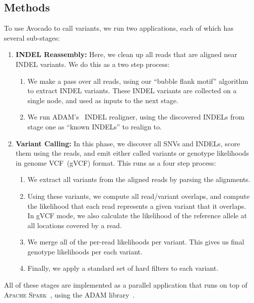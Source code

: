 \documentclass{bioinfo}
\begin{document}
\begin{methods}
\section{Methods}
\label{sec:methods}

To use Avocado to call variants, we run two applications, each of which has several
sub-stages:

\begin{enumerate}
\item \textbf{INDEL Reassembly:} Here, we clean up all reads that are aligned
near INDEL variants. We do this as a two step process:
\begin{enumerate}
\item We make a pass over all reads, using our ``bubble flank motif'' algorithm
to extract INDEL variants. These INDEL variants are collected on a single node,
and used as inputs to the next stage.
\item We run \textsc{ADAM}'s~\citep{massie13, nothaft15} INDEL realigner, using the
discovered INDELs from stage one as ``known INDELs'' to realign to.
\end{enumerate}
\item \textbf{Variant Calling:} In this phase, we discover all SNVs and INDELs,
score them using the reads, and emit either called variants or genotype
likelihoods in genome VCF~(gVCF) format. This runs as a four step process:
\begin{enumerate}
\item We extract all variants from the aligned reads by parsing the alignments.
\item Using these variants, we compute all read/variant overlaps, and compute
the likelihood that each read represents a given variant that it overlaps. In
gVCF mode, we also calculate the likelihood of the reference allele at all
locations covered by a read.
\item We merge all of the per-read likelihoods per variant. This gives us final
genotype likelihoods per each variant.
\item Finally, we apply a standard set of hard filters to each variant.
\end{enumerate}
\end{enumerate}

All of these stages are implemented as a parallel application that runs on top of
\textsc{Apache Spark}~\citep{zaharia10, zaharia12}, using the \textsc{ADAM}
library~\citep{massie13, nothaft15}.


\end{methods}
\end{document}
